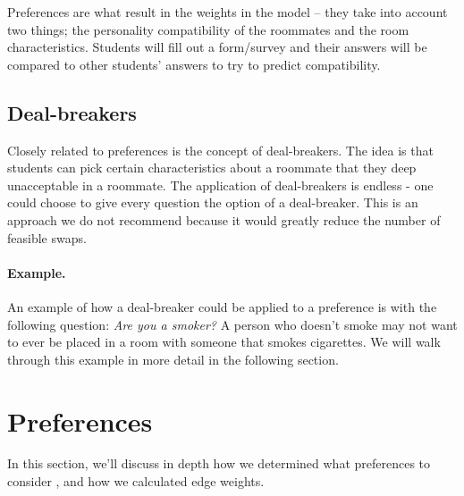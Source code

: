 \documentclass[12pt]{article}
\begin{document}
\noindent Preferences are what result in the weights in the model – they take into account two things; the personality compatibility of the roommates and the room characteristics. Students will fill out a form/survey and their answers will be compared to other students’ answers to try to predict compatibility. 

\subsection{Deal-breakers} 
Closely related to preferences is the concept of deal-breakers. The idea is that students can pick certain characteristics about a roommate that they deep unacceptable in a roommate. The application of deal-breakers is endless - one could choose to give every question the option of a deal-breaker. This is an approach we do not recommend because it would greatly reduce the number of feasible swaps. 
\paragraph{Example.}
An example of how a deal-breaker could be applied to a preference is with the following question: \textit{Are you a smoker?} A person who doesn't smoke may not want to ever be placed in a room with someone that smokes cigarettes. We will walk through this example in more detail in the following section.

\section{Preferences}
In this section, we'll discuss in depth how we determined what preferences to consider , and how we calculated edge weights. 
\end{document}
